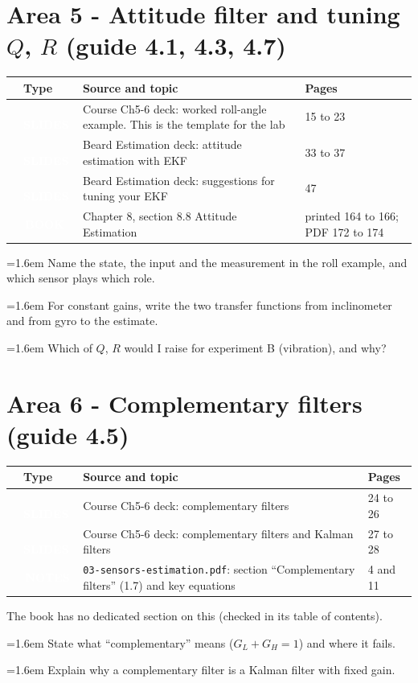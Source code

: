 \documentclass[10pt,a4paper]{article}
\newcommand{\cb}{\raisebox{-0.35ex}{\Large$\square$}}
\newcommand{\cbx}{\raisebox{-0.35ex}{\Large$\boxtimes$}}
\newcommand{\srctag}[2]{\colorbox{#1}{\textcolor{white}{\textbf{\scriptsize\,#2\,}}}}
\newcommand{\SLIDES}{\srctag{slides}{SLIDES}}
\newcommand{\BOOK}{\srctag{book}{BOOK}}
\newcommand{\NOTES}{\srctag{notes}{NOTES}}
\newcommand{\chkx}[1]{\par\noindent\hangindent=1.6em\hangafter=1 \cbx\hspace{0.6em}#1}
\begin{document}
\section*{Area 5 - Attitude filter and tuning $Q$, $R$ \hfill\normalfont\small (guide 4.1, 4.3, 4.7)}

\begin{tabularx}{\textwidth}{@{}C T X l@{}}
\toprule
\cb & Type & Source and topic & Pages\\
\midrule
\cbx & \SLIDES & Course Ch5-6 deck: worked roll-angle example. This is the template for the lab & 15 to 23\\
\cbx & \SLIDES & Beard Estimation deck: attitude estimation with EKF & 33 to 37\\
\cbx & \SLIDES & Beard Estimation deck: suggestions for tuning your EKF & 47\\
\cbx & \BOOK & Chapter 8, section 8.8 Attitude Estimation & printed 164 to 166; PDF 172 to 174\\
\bottomrule
\end{tabularx}
\begin{selfcheck}
\chkx{Name the state, the input and the measurement in the roll example, and which sensor plays which role.}
\chkx{For constant gains, write the two transfer functions from inclinometer and from gyro to the estimate.}
\chkx{Which of $Q$, $R$ would I raise for experiment B (vibration), and why?}
\end{selfcheck}

\section*{Area 6 - Complementary filters \hfill\normalfont\small (guide 4.5)}

\begin{tabularx}{\textwidth}{@{}C T X l@{}}
\toprule
\cb & Type & Source and topic & Pages\\
\midrule
\cbx & \SLIDES & Course Ch5-6 deck: complementary filters & 24 to 26\\
\cbx & \SLIDES & Course Ch5-6 deck: complementary filters and Kalman filters & 27 to 28\\
\cbx & \NOTES & \texttt{03-sensors-estimation.pdf}: section ``Complementary filters'' (1.7) and key equations & 4 and 11\\
\bottomrule
\end{tabularx}
The book has no dedicated section on this (checked in its table of contents).
\begin{selfcheck}
\chkx{State what ``complementary'' means ($G_L+G_H=1$) and where it fails.}
\chkx{Explain why a complementary filter is a Kalman filter with fixed gain.}
\end{selfcheck}
\end{document}
